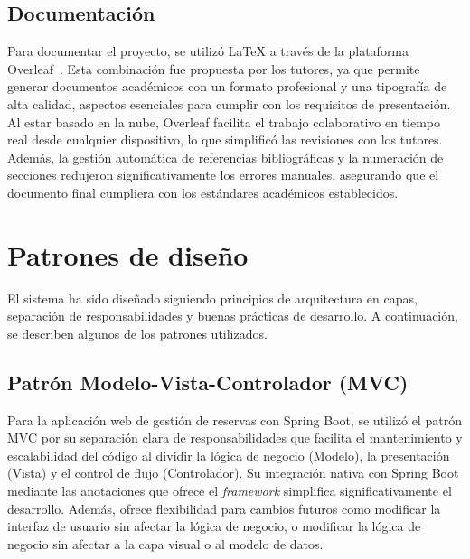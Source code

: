 \subsection{Documentación}\label{documentacion}
Para documentar el proyecto, se utilizó \LaTeX{} a través de la plataforma Overleaf~\cite{overleaf}. Esta combinación fue propuesta por los tutores, ya que permite generar documentos académicos con un formato profesional y una tipografía de alta calidad, aspectos esenciales para cumplir con los requisitos de presentación. Al estar basado en la nube, Overleaf facilita el trabajo colaborativo en tiempo real desde cualquier dispositivo, lo que simplificó las revisiones con los tutores. Además, la gestión automática de referencias bibliográficas y la numeración de secciones redujeron significativamente los errores manuales, asegurando que el documento final cumpliera con los estándares académicos establecidos.

\section{Patrones de diseño}\label{patron-de-diseño}

El sistema ha sido diseñado siguiendo principios de arquitectura en capas, separación de responsabilidades y buenas prácticas de desarrollo. A continuación, se describen algunos de los patrones utilizados.

\subsection{Patrón Modelo-Vista-Controlador (MVC)}\label{patron-modelo-vista-controlador}
Para la aplicación web de gestión de reservas con Spring Boot, se utilizó el patrón MVC por su separación clara de responsabilidades que facilita el mantenimiento y escalabilidad del código al dividir la lógica de negocio (Modelo), la presentación (Vista) y el control de flujo (Controlador). Su integración nativa con Spring Boot mediante las anotaciones que ofrece el \emph{framework} simplifica significativamente el desarrollo. Además, ofrece flexibilidad para cambios futuros como modificar la interfaz de usuario sin afectar la lógica de negocio, o modificar la lógica de negocio sin afectar a la capa visual o al modelo de datos.

